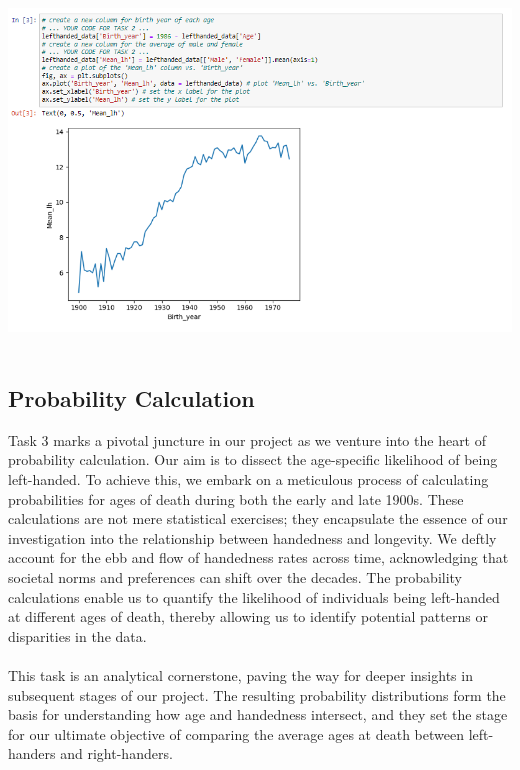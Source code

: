 \documentclass{article}
\begin{document}
\vspace{0.5cm}
        \begin{center}
            \includegraphics[height=270pt]{2.png}\\
        \end{center}
\vspace{0.5cm}

\subsection{Probability Calculation}

Task 3 marks a pivotal juncture in our project as we venture into the heart of probability calculation. Our aim is to dissect the age-specific likelihood of being left-handed. To achieve this, we embark on a meticulous process of calculating probabilities for ages of death during both the early and late 1900s. These calculations are not mere statistical exercises; they encapsulate the essence of our investigation into the relationship between handedness and longevity. We deftly account for the ebb and flow of handedness rates across time, acknowledging that societal norms and preferences can shift over the decades. The probability calculations enable us to quantify the likelihood of individuals being left-handed at different ages of death, thereby allowing us to identify potential patterns or disparities in the data.\\ \\This task is an analytical cornerstone, paving the way for deeper insights in subsequent stages of our project. The resulting probability distributions form the basis for understanding how age and handedness intersect, and they set the stage for our ultimate objective of comparing the average ages at death between left-handers and right-handers.
\end{document}
